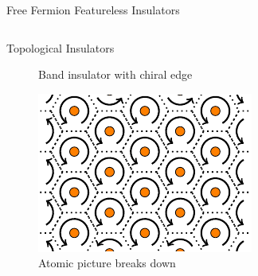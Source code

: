 \begin{frame}{Free Fermion Featureless Insulators}
\begin{columns}[T]
\begin{column}[T]{.5\textwidth}
\begin{block}{Topological Insulators}
\begin{figure}
			\caption{Band insulator with chiral edge \footnotemark}
		\end{figure}
		\begin{figure}
			\vskip-0.7cm
				\includegraphics[width=0.5\linewidth]{diagrams/honeycomb_breakdown.pdf}
				\caption{Atomic picture breaks down}
		\end{figure}
	\end{block}

\end{column}
\end{columns}
\end{frame}

